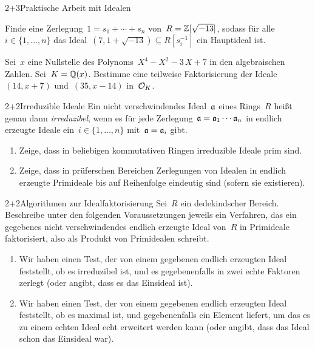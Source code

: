 \documentclass{algblatt}
\begin{document}

\begin{aufgabeE}{2+3}{Praktische Arbeit mit Idealen}
\item Finde eine Zerlegung~$1 = s_1 + \cdots + s_n$ von~$R = \ZZ[\sqrt{-13}]$,
sodass für alle~$i \in \{ 1,\ldots,n \}$ das Ideal~$(7, 1 + \sqrt{-13})
\subseteq R[s_i^{-1}]$ ein Hauptideal ist.
\item Sei~$x$ eine Nullstelle des Polynoms~$X^4-X^2-3\,X+7$ in den
algebraischen Zahlen. Sei~$K = \QQ(x)$. Bestimme eine teilweise Faktorisierung
der Ideale~$(14,x+7)$ und~$(35,x-14)$ in~$\O_K$.
\end{aufgabeE}

\begin{aufgabe}{2+2}{Irreduzible Ideale}
Ein nicht verschwindendes Ideal~$\aa$ eines Rings~$R$ heißt genau dann
\emph{irreduzibel}, wenn es für jede Zerlegung~$\aa = \aa_1 \cdots \aa_n$ in
endlich erzeugte Ideale ein~$i \in \{1,\ldots,n\}$ mit~$\aa = \aa_i$ gibt.
\begin{enumerate}
\item Zeige, dass in beliebigen kommutativen Ringen irreduzible Ideale
prim
sind.
\item Zeige, dass in prüferschen Bereichen Zerlegungen von Idealen in endlich
erzeugte Primideale
bis auf Reihenfolge eindeutig sind (sofern sie existieren).
\end{enumerate}
\end{aufgabe}

\begin{aufgabe}{2+2}{Algorithmen zur Idealfaktorisierung}
Sei~$R$ ein dedekindscher Bereich. Beschreibe unter den folgenden
Voraussetzungen jeweils ein Verfahren, das ein gegebenes nicht verschwindendes
endlich erzeugte Ideal von~$R$ in Primideale faktorisiert, also als Produkt von
Primidealen schreibt.
\begin{enumerate}
\item Wir haben einen Test, der von einem gegebenen endlich erzeugten Ideal feststellt,
ob es irreduzibel ist, und es gegebenenfalls in zwei echte Faktoren zerlegt
(oder angibt, dass es das Einsideal ist).
\item Wir haben einen Test, der von einem gegebenen endlich erzeugten Ideal
feststellt, ob es maximal ist, und gegebenenfalls ein Element liefert, um das
es zu einem echten Ideal echt erweitert werden kann (oder angibt, dass das
Ideal schon das Einsideal war).
\end{enumerate}
\end{aufgabe}
\end{document}
